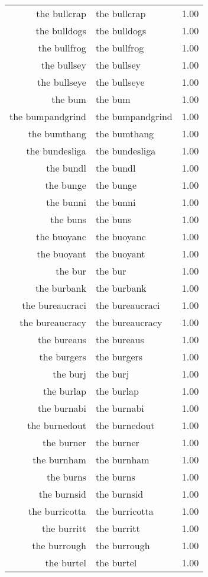 \begin{table}[ht]
\begin{tabular}{rlr}
  the bullcrap & the bullcrap & 1.00 \\ 
  the bulldogs & the bulldogs & 1.00 \\ 
  the bullfrog & the bullfrog & 1.00 \\ 
  the bullsey & the bullsey & 1.00 \\ 
  the bullseye & the bullseye & 1.00 \\ 
  the bum & the bum & 1.00 \\ 
  the bumpandgrind & the bumpandgrind & 1.00 \\ 
  the bumthang & the bumthang & 1.00 \\ 
  the bundesliga & the bundesliga & 1.00 \\ 
  the bundl & the bundl & 1.00 \\ 
  the bunge & the bunge & 1.00 \\ 
  the bunni & the bunni & 1.00 \\ 
  the buns & the buns & 1.00 \\ 
  the buoyanc & the buoyanc & 1.00 \\ 
  the buoyant & the buoyant & 1.00 \\ 
  the bur & the bur & 1.00 \\ 
  the burbank & the burbank & 1.00 \\ 
  the bureaucraci & the bureaucraci & 1.00 \\ 
  the bureaucracy & the bureaucracy & 1.00 \\ 
  the bureaus & the bureaus & 1.00 \\ 
  the burgers & the burgers & 1.00 \\ 
  the burj & the burj & 1.00 \\ 
  the burlap & the burlap & 1.00 \\ 
  the burnabi & the burnabi & 1.00 \\ 
  the burnedout & the burnedout & 1.00 \\ 
  the burner & the burner & 1.00 \\ 
  the burnham & the burnham & 1.00 \\ 
  the burns & the burns & 1.00 \\ 
  the burnsid & the burnsid & 1.00 \\ 
  the burricotta & the burricotta & 1.00 \\ 
  the burritt & the burritt & 1.00 \\ 
  the burrough & the burrough & 1.00 \\ 
  the burtel & the burtel & 1.00 \\ 

\end{tabular}
\end{table}
